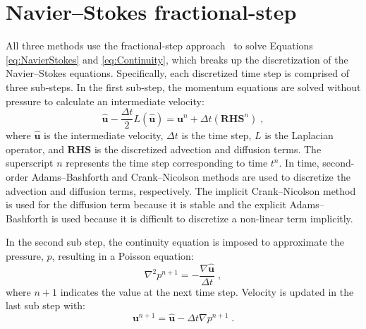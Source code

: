\section{Navier--Stokes fractional-step}\label{NM:NavierStokes}
All three methods use the fractional-step approach~\cite{Perot1993} to solve Equations \eqref{eq:NavierStokes} and \eqref{eq:Continuity}, which breaks up the discretization of the Navier--Stokes equations. 
Specifically, each discretized time step is comprised of three sub-steps.
In the first sub-step, the momentum equations are solved without pressure to  calculate an intermediate velocity:
\begin{equation}\label{eq:Intermediate Velocity}
\hat{\textbf{u}} - \frac{\Delta t}{2}L(\hat{\textbf{u}}) = \textbf{u}^n + \Delta t(\textbf{RHS}^n) \;,
\end{equation}
where $\hat{\textbf{u}}$ is the intermediate velocity, $\Delta t$ is the time step, $L$ is the Laplacian operator, and $\textbf{RHS}$ is the discretized advection and diffusion terms. 
The superscript $n$ represents the time step corresponding to time $t^n$. 
In time, second-order Adams--Bashforth and Crank--Nicolson methods are used to discretize the advection and diffusion terms, respectively. 
The implicit Crank--Nicolson method is used for the diffusion term because it is stable and the explicit Adams--Bashforth is used because it is difficult to discretize a non-linear term implicitly. 

In the second sub step, the continuity equation is imposed to approximate the pressure, $p$, resulting in a Poisson equation:
\begin{equation}\label{eq:Poisson}
\nabla^2p^{n+1} = - \frac{\nabla\hat{\textbf{u}}}{\Delta t} \;,
\end{equation}
\newline where $n+1$ indicates the value at the next time step. Velocity is updated in the last sub step with:
\begin{equation}\label{eq:Projection}
\textbf{u}^{n+1} = \hat{\textbf{u}} - \Delta t\nabla p^{n+1} \;.
\end{equation}

